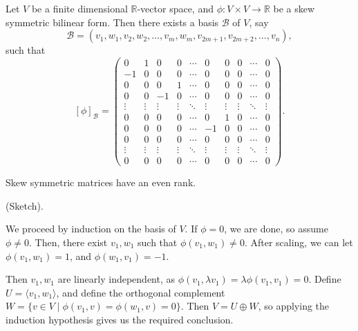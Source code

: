 \documentclass[12pt]{article}
\begin{document}
\begin{theorem}
	Let $V$ be a finite dimensional $\mathbb{R}$-vector space, and $\phi : V \times V \to \mathbb{R}$ be a skew symmetric bilinear form. Then there exists a basis $\mathcal{B}$ of $V$, say
	\[
	\mathcal{B} = (v_1, w_1, v_2, w_2, \ldots, v_m, w_m, v_{2m+1}, v_{2m+2}, \ldots, v_n)
	,\]
	such that
	\[
		[\phi]_{\mathcal{B}} =
		\begin{pmatrix}
			0 & 1 & 0 & 0 & \cdots & 0 & 0 & 0 & \cdots & 0 \\
			-1 & 0 & 0 & 0 & \cdots & 0 & 0 & 0 & \cdots & 0 \\
			0 & 0 & 0 & 1 & \cdots & 0 & 0 & 0 & \cdots & 0 \\
			0 & 0 & -1 & 0 & \cdots & 0 & 0 & 0 & \cdots & 0 \\
			\vdots & \vdots & \vdots & \vdots & \ddots & \vdots & \vdots & \vdots & \ddots & \vdots \\
			0 & 0 & 0 & 0 & \cdots & 0 & 1 & 0 & \cdots & 0 \\
			0 & 0 & 0 & 0 & \cdots & -1 & 0 & 0 & \cdots & 0 \\
			0 & 0 & 0 & 0 & \cdots & 0 & 0 & 0 & \cdots & 0 \\
			\vdots & \vdots & \vdots & \vdots & \ddots & \vdots & \vdots & \vdots & \ddots & \vdots \\
			0 & 0 & 0 & 0 & \cdots & 0 & 0 & 0 & \cdots & 0
		\end{pmatrix}
	.\]
\end{theorem}

\begin{corollary}
	Skew symmetric matrices have an even rank.
\end{corollary}

\begin{proofbox}
	(Sketch).

	We proceed by induction on the basis of $V$. If $\phi = 0$, we are done, so assume $\phi \neq 0$. Then, there exist $v_1, w_1$ such that $\phi(v_1, w_1) \neq 0$. After scaling, we can let $\phi(v_1, w_1) = 1$, and $\phi(w_1, v_1) = -1$.

	Then $v_1, w_1$ are linearly independent, as $\phi(v_1, \lambda v_1) = \lambda \phi(v_1, v_1) = 0$. Define $U = \langle v_1, w_1 \rangle$, and define the orthogonal complement $W = \{ v \in V \mid \phi(v_1, v) = \phi(w_1, v) = 0\}$. Then $V = U \oplus W$, so applying the induction hypothesis gives us the required conclusion.
\end{proofbox}
\end{document}
